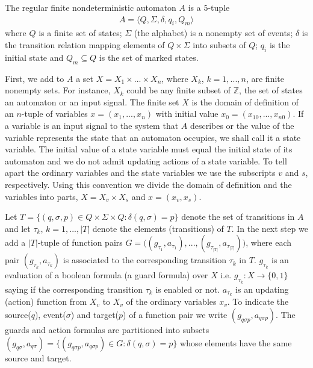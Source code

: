 \documentclass{article}
\begin{document}
The regular finite nondeterministic automaton
$A$ is a $5$-tuple
\begin{eqnarray}
A=\langle Q,\Sigma,\delta, q_i,Q_m \rangle\nonumber
\end{eqnarray} where $Q$ is a finite set of states; $\Sigma$ (the alphabet) is a nonempty
set of events; $\delta$ is the transition relation mapping elements of $Q\times\Sigma$ into subsets of $Q$; $q_i$ is the
initial state and $Q_m \subseteq Q$ is the set of marked states.




First, we add to $A$ a set $X=X_1\times ... \times X_n$, where
$X_k$, $k=1,...,n$, are finite nonempty sets. For instance, $X_k$
could be any finite subset of $\mathbb{Z}$, the set of states an automaton or
an input signal. The finite set $X$ is the
domain of definition of an $n$-tuple of variables
$x=(x_1,...,x_n)$ with initial value $x_0=(x_{10},...,x_{n0})$. If a variable is
an input signal to the system that $A$ describes or the value
of the variable represents the state that an automaton occupies, we
shall call it a state variable. The initial value of a state
variable must equal the initial state of its automaton and we do
not admit updating actions of a state variable. To tell apart the
ordinary variables and the state variables we use the subscripts
$v$ and $s$, respectively. Using this convention we divide the
domain of definition and the variables into parts, $X=X_v \times
X_s$ and $x=(x_v,x_s)$.

 Let $T=\{(q,\sigma,p)\in Q \times \Sigma\times Q:
\delta(q,\sigma)=p\}$ denote the set of transitions in $A$ and let
$\tau_k$, $k=1,...,|T|$ denote the elements (transitions) of $T$. In the next step we
 add a $|T|$-tuple of function pairs $G=\big((g_{\tau_1},a_{\tau_1}),...,
(g_{\tau_{|T|}},a_{\tau_{|T|}})\big)$, where each pair
$(g_{\tau_k},a_{\tau_k})$ is associated to the corresponding
transition $\tau_k$ in $T$. $g_{\tau_k}$ is an evaluation of a
boolean formula (a guard formula) over $X$ i.e. $g_{\tau_k}:X
\rightarrow \{0,1\}$ saying if the corresponding transition
$\tau_k$ is enabled or not. $a_{\tau_k}$ is an updating (action)
function from $X_v$ to $X_v$ of the ordinary variables $x_v$. To
indicate the source($q$), event($\sigma$) and target($p$) of a
function pair we write $(g_{q\sigma p},a_{q\sigma p})$. The guards and
action formulas are partitioned into subsets $(g_{q\sigma},a_{q\sigma})=\{(g_{q\sigma p},a_{q\sigma p})\in G:
\delta(q,\sigma)=p\}$ whose elements have the same source and target.
\end{document}
